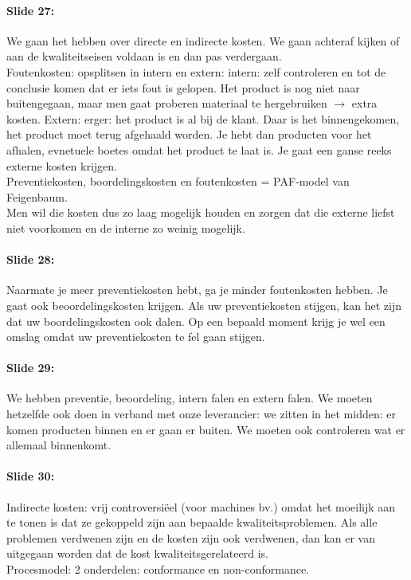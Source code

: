 \documentclass[10pt,a4paper]{report}
\begin{document}
\paragraph{Slide 27:} We gaan het hebben over directe en indirecte kosten. We gaan achteraf kijken of aan de kwaliteitseisen voldaan is en dan pas verdergaan.\\
Foutenkosten: opsplitsen in intern en extern: intern: zelf controleren en tot de conclusie komen dat er iets fout is gelopen. Het product is nog niet naar buitengegaan, maar men gaat proberen materiaal te hergebruiken $\rightarrow$ extra kosten. Extern: erger: het product is al bij de klant. Daar is het binnengekomen, het product moet terug afgehaald worden. Je hebt dan producten voor het afhalen, evnetuele boetes omdat het product te laat is. Je gaat een ganse reeks externe kosten krijgen.\\
Preventiekosten, boordelingskosten en foutenkosten = PAF-model van Feigenbaum. \\
Men wil die kosten dus zo laag mogelijk houden en zorgen dat die externe liefst niet voorkomen en de interne zo weinig mogelijk. 

\paragraph{Slide 28:} Naarmate je meer preventiekosten hebt, ga je minder foutenkosten hebben. Je gaat ook beoordelingskosten krijgen. Als uw preventiekosten stijgen, kan het zijn dat uw boordelingskosten ook dalen. Op een bepaald moment krijg je wel een omslag omdat uw preventiekosten te fel gaan stijgen. 

\paragraph{Slide 29:} We hebben preventie, beoordeling, intern falen en extern falen. We moeten hetzelfde ook doen in verband met onze leverancier: we zitten in het midden: er komen producten binnen en er gaan er buiten. We moeten ook controleren wat er allemaal binnenkomt. 

\paragraph{Slide 30:} Indirecte kosten: vrij controversi\"eel (voor machines bv.) omdat het moeilijk aan te tonen is dat ze gekoppeld zijn aan bepaalde kwaliteitsproblemen. Als alle problemen verdwenen zijn en de kosten zijn ook verdwenen, dan kan er van uitgegaan worden dat de kost kwaliteitsgerelateerd is. \\
Procesmodel: 2 onderdelen: conformance en non-conformance.
\end{document}
